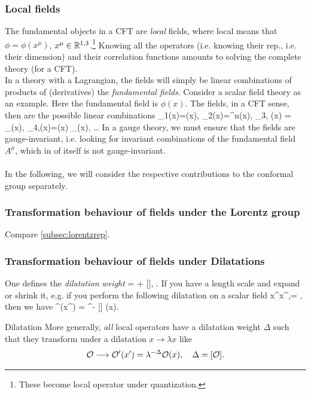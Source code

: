 \subsubsection{Local fields}
The fundamental objects in a CFT are \emph{local} fields, where local means that $\phi=\phi(x^\mu)$, $x^\mu \in \mathbb{R}^{1,3}$.\footnote{These become local operator under quantization.} Knowing all the operators (i.e. knowing their rep., i.e. their dimension) and their correlation functions amounts to solving the complete theory (for a CFT).\\
In a theory with a Lagrangian, the fields will simply be linear combinations of products of (derivatives) the \emph{fundamental fields}. Consider a scalar field theory as an example. Here the fundamental field is $\phi(x)$. The fields, in a CFT sense, then are the possible linear combinations
\bse
\mO_1(x)=\phi(x),\;  \mO_2(x)=\phi^n(x),\; \mO_{3,\mu} (x) = \partial_\mu \phi(x),\; \mO_{4,\mu}(x)=\phi(x) \partial_\mu \phi(x), \; \dots 
\ese 
In a gauge theory, we must ensure that the fields are gauge-invariant, i.e. looking for invariant combinations of the fundamental field $A^\mu$, which in of itself is not gauge-invariant.
\\
\\
In the following, we will consider the respective contributions to the conformal group separately.
\subsubsection{Transformation behaviour of fields under the Lorentz group}
Compare \ref{subsec:lorentzrep}.

\subsubsection{Transformation behaviour of fields under Dilatations}
One defines the \emph{dilatation weight} 
\be
\label{eq:cftdilatationweight}
\Delta = + [\mO], \qquad {} \mO.
\ee 
If you have a length scale and expand or shrink it, e.g. if you perform the following dilatation on a scalar field
\bse
x^\mu \rightarrow \lambda x^\mu,\qquad [\phi] = ,
\ese 
then we have
\bse 
\phi {} \phi^\prime (x^\prime) = \lambda^{- [\phi]} \phi(x).
\ese 
\begin{mybox}{Dilatation}
	More generally, \emph{all} local operators have a dilatation weight $\Delta$ such that they transform under a dilatation $x\rightarrow \lambda x$ like
	\begin{equation}
		\mathcal{O} \longrightarrow \mathcal{O}^\prime(x^\prime) = \lambda^{-\Delta} \mathcal{O}(x),\quad \Delta = [\mathcal{O}].
	\end{equation}
\end{mybox}

